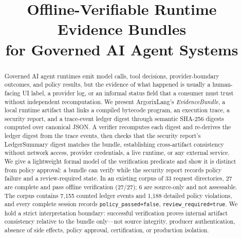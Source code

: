 \documentclass[conference]{IEEEtran}
\newcommand{\code}[1]{\texttt{\small #1}}
\newcommand{\Argorix}{%
\textcolor{argViolet}{A}\textcolor{argViolet}{r}\textcolor{argIndigo}{g}\textcolor{argIndigo}{o}\textcolor{argElectric}{r}\textcolor{argElectric}{i}\textcolor{argElectric}{x}\textcolor{argCyan}{L}\textcolor{argCyan}{a}\textcolor{argCyanBright}{n}\textcolor{argCyanBright}{g}\xspace}
\begin{document}
\title{Offline-Verifiable Runtime Evidence Bundles\\for Governed AI Agent Systems}

\author{
}

\maketitle

\begin{abstract}
Governed AI agent runtimes emit model calls, tool decisions, provider-boundary
outcomes, and policy results, but the evidence of what happened is usually a
human-facing UI label, a provider log, or an informal status field that a consumer must
trust without independent recomputation. We present \Argorix's \emph{EvidenceBundle}, a
local runtime artifact that links a compiled bytecode program, an execution trace, a
security report, and a trace-event ledger digest through semantic SHA-256 digests
computed over canonical JSON. A verifier recomputes each digest and re-derives the
ledger digest from the trace events, then checks that the security report's
LedgerSummary digest matches the bundle, establishing cross-artifact consistency without
network access, provider credentials, a live runtime, or any external service. We give a
lightweight formal model of the verification predicate and show it is distinct from
policy approval: a bundle can verify while the security report records policy failure and
a review-required state. In an existing corpus of 33 request directories, 27 are complete
and pass offline verification (27/27); 6 are source-only and not assessable. The corpus
contains 7{,}155 counted ledger events and 1{,}188 detailed policy violations, and every
complete session records \code{policy\_passed=false}, \code{review\_required=true}. We
hold a strict interpretation boundary: successful verification proves internal artifact
consistency relative to the bundle only---not source integrity, producer authentication,
absence of side effects, policy approval, certification, or production isolation.
\end{abstract}
\end{document}
